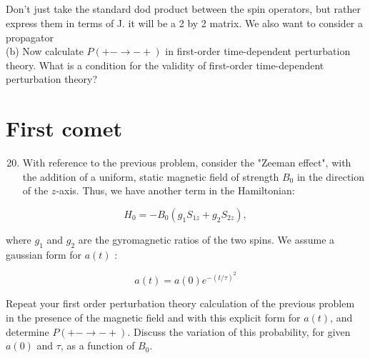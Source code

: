 \documentclass[12pt]{article}
\begin{document}
\subsection{}
Don't just take the standard dod product between the spin operators, but rather express them in terms of J. it will be a 2 by 2 matrix. We also want to consider a propagator\\
(b) Now calculate $P(+-\rightarrow-+)$ in first-order time-dependent perturbation theory. What is a condition for the validity of first-order time-dependent perturbation theory?
\subsection{}
\section{First comet}
\begin{enumerate}
  \setcounter{enumi}{19}
  \item With reference to the previous problem, consider the "Zeeman effect", with the addition of a uniform, static magnetic field of strength $B_{0}$ in the direction of the $z$-axis. Thus, we have another term in the Hamiltonian:
\end{enumerate}

$$
H_{0}=-B_{0}\left(g_{1} S_{1 z}+g_{2} S_{2 z}\right),
$$

where $g_{1}$ and $g_{2}$ are the gyromagnetic ratios of the two spins. We assume a gaussian form for $a(t)$ :

$$
a(t)=a(0) e^{-(t / \tau)^{2}}
$$

Repeat your first order perturbation theory calculation of the previous problem in the presence of the magnetic field and with this explicit form for $a(t)$, and determine $P(+-\rightarrow-+)$. Discuss the variation of this probability, for given $a(0)$ and $\tau$, as a function of $B_{0}$.
\end{document}
